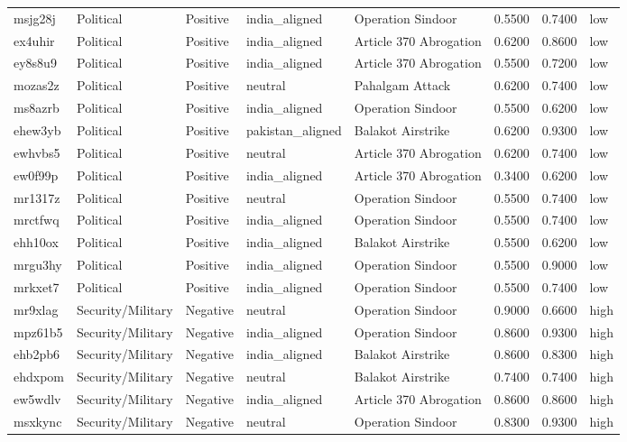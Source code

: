 \begin{longtable}{lllllrrl}
msjg28j & Political & Positive & india\_aligned & Operation Sindoor & 0.5500 & 0.7400 & low \\
ex4uhir & Political & Positive & india\_aligned & Article 370 Abrogation & 0.6200 & 0.8600 & low \\
ey8s8u9 & Political & Positive & india\_aligned & Article 370 Abrogation & 0.5500 & 0.7200 & low \\
mozas2z & Political & Positive & neutral & Pahalgam Attack & 0.6200 & 0.7400 & low \\
ms8azrb & Political & Positive & india\_aligned & Operation Sindoor & 0.5500 & 0.6200 & low \\
ehew3yb & Political & Positive & pakistan\_aligned & Balakot Airstrike & 0.6200 & 0.9300 & low \\
ewhvbs5 & Political & Positive & neutral & Article 370 Abrogation & 0.6200 & 0.7400 & low \\
ew0f99p & Political & Positive & india\_aligned & Article 370 Abrogation & 0.3400 & 0.6200 & low \\
mr1317z & Political & Positive & neutral & Operation Sindoor & 0.5500 & 0.7400 & low \\
mrctfwq & Political & Positive & india\_aligned & Operation Sindoor & 0.5500 & 0.7400 & low \\
ehh10ox & Political & Positive & india\_aligned & Balakot Airstrike & 0.5500 & 0.6200 & low \\
mrgu3hy & Political & Positive & india\_aligned & Operation Sindoor & 0.5500 & 0.9000 & low \\
mrkxet7 & Political & Positive & india\_aligned & Operation Sindoor & 0.5500 & 0.7400 & low \\
mr9xlag & Security/Military & Negative & neutral & Operation Sindoor & 0.9000 & 0.6600 & high \\
mpz61b5 & Security/Military & Negative & india\_aligned & Operation Sindoor & 0.8600 & 0.9300 & high \\
ehb2pb6 & Security/Military & Negative & india\_aligned & Balakot Airstrike & 0.8600 & 0.8300 & high \\
ehdxpom & Security/Military & Negative & neutral & Balakot Airstrike & 0.7400 & 0.7400 & high \\
ew5wdlv & Security/Military & Negative & india\_aligned & Article 370 Abrogation & 0.8600 & 0.8600 & high \\
msxkync & Security/Military & Negative & neutral & Operation Sindoor & 0.8300 & 0.9300 & high \\

\end{longtable}
